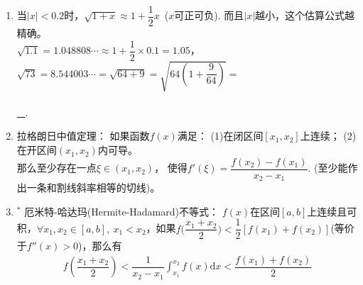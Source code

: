 \documentclass{article}
\newif\ifte
\renewcommand{\d}{\mathrm{d}}
\begin{document}
\begin{multicols}{2}
\begin{enumerate}[leftmargin=20pt]
\item 当$ |x| < 0.2 $时，$ \sqrt{1+x}\approx 1+\dfrac{1}{2}x $\ ($ x $可正可负).
而且$ |x| $越小，这个估算公式越精确。\\
$ \sqrt{1.1}=1.048808\cdots \approx 1+\dfrac{1}{2}\times 0.1=1.05 $，\\
$ \sqrt{73}=8.544003\cdots=\sqrt{64+9}=\sqrt{64\left(1+\dfrac{9}{64}\right)}=$
\ifte \underline{\ $ 8\sqrt{1+\dfrac{9}{64}}\approx 8\left(1+
\dfrac{9}{2\times 64}\right)=8+\dfrac{9}{2\times 8}=8\dfrac{9}{16} $}
\else\\ \\ \underline{\ \hspace{8cm} }\fi .

\item 拉格朗日中值定理： 如果函数$ f(x) $满足：
(1)在闭区间$ [x_1,x_2] $上连续；
(2)在开区间$ (x_1,x_2) $内可导。\\
那么至少存在一点$ \xi\in(x_1,x_2) $，
使得$ f'(\xi)=\dfrac{f(x_2)-f(x_1)}{x_2-x_1} $.
(至少能作出一条和割线斜率相等的切线)。 

\item $^*$ 厄米特-哈达玛(Hermite-Hadamard)不等式：
$ f(x) $在区间$ [a,b] $上连续且可积，$ \forall x_1,x_2\in [a,b],\ 
x_1<x_2 $，如果$ f\Big(\dfrac{x_1+x_2}{2}\Big)<
\dfrac{1}{2}[f(x_1)+f(x_2)] $(等价于$ f''(x)>0 $)，那么有 
\begin{align*}
    f\left(\dfrac{x_1+x_2}{2}\right)<\dfrac{1}{x_2-x_1}
    \int_{x_1}^{x_2}f(x)\d x< \dfrac{f(x_1)+f(x_2)}{2}
\end{align*}


\end{enumerate}
\end{multicols}
\end{document}
